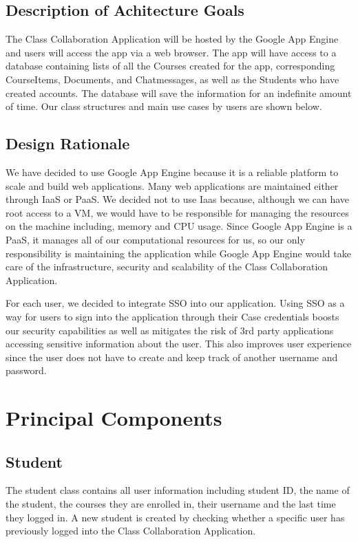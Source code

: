 \documentclass[16pt]{scrreprt}
\begin{document}
\section{Description of Achitecture Goals}
The Class Collaboration Application will be hosted by the Google App Engine and users will access the app via a web browser. The app will have access to a database containing lists of all the Courses created for the app, corresponding CourseItems, Documents, and Chatmessages, as well as the Students who have created accounts. The database will save the information for an indefinite amount of time. Our class structures and main use cases by users are shown below. 

\section{Design Rationale}
\hspace{10mm}We have decided to use Google App Engine because it is a reliable platform to scale and build web applications. Many web applications are maintained either through IaaS or PaaS. We decided not to use Iaas because, although we can have root access to a VM, we would have to be responsible for managing the resources on the machine including, memory and CPU usage. Since Google App Engine is a PaaS, it manages all of our computational resources for us, so our only responsibility is maintaining the application while Google App Engine would take care of the infrastructure, security and scalability of the Class Collaboration Application. 

\hspace{10mm}For each user, we decided to integrate SSO into our application. Using SSO as a way for users to sign into the application through their Case credentials boosts our security capabilities as well as mitigates the risk of 3rd party applications accessing sensitive information about the user. This also improves user experience since the user does not have to create and keep track of another username and password. 



\chapter{Principal Components}
	
\section{Student}
The student class contains all user information including student ID, the name of the student, the courses they are enrolled in, their username and the last time they logged in. A new student is created by checking whether a specific user has previously logged into the Class Collaboration Application.
\end{document}

